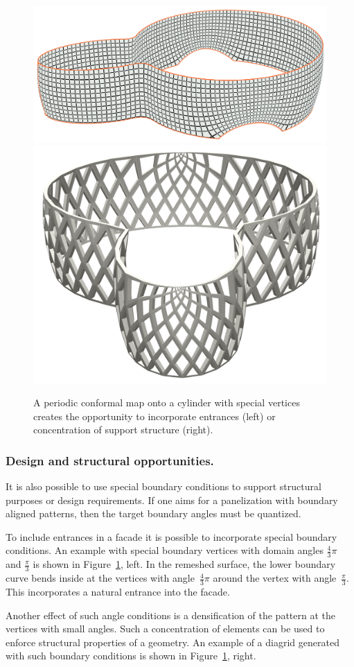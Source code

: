 \documentclass[article.tex]{subfiles}
\begin{document}
\begin{figure}[bt]
  \centering
  \includegraphics[width=.52\linewidth]{images/wanda_entrances.png}
  \hspace{.5cm}
  \includegraphics[width=.32\linewidth]{images/wanda_diagrid.png}
  \caption{A periodic conformal map onto a cylinder with special
    vertices creates the opportunity to incorporate entrances (left)
    or concentration of support structure (right).}
  \label{fig:entrance}
\end{figure}

\subsubsection{Design and structural opportunities.}
It is also possible to use special boundary conditions to support
structural purposes or design requirements. If one aims for a
panelization with boundary aligned patterns, then the target boundary
angles must be quantized. 

To include entrances in a facade it is possible to incorporate special 
boundary conditions. An example with special boundary vertices with domain angles
$\frac{4}{3}\pi$ and $\tfrac{\pi}{3}$ is shown in
Figure~\ref{fig:entrance}, left. In the remeshed surface, the lower boundary
curve bends inside at the vertices with angle~$\tfrac{4}{3}\pi$ around
the vertex with angle~$\tfrac{\pi}{3}$. This incorporates a natural
entrance into the facade.

Another effect of such angle conditions is a densification of the
pattern at the vertices with small angles. Such a concentration of
elements can be used to enforce structural properties of a
geometry. An example of a diagrid generated with such boundary
conditions is shown in Figure~\ref{fig:entrance}, right.
\end{document}
